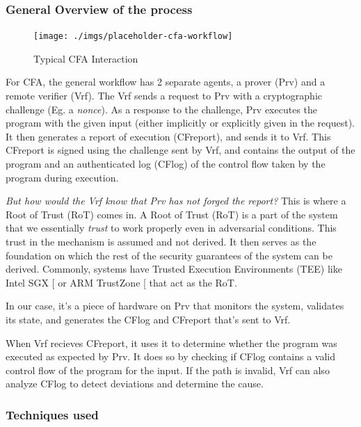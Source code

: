 \documentclass[a4paper, nobind]{templates/ociamthesis}
\begin{document}
\subsubsection{General Overview of the process}\label{general-overview-of-the-process}

\begin{figure}[H]

{\centering \texttt{[image: ./imgs/placeholder-cfa-workflow]} 

}

\caption{Typical CFA Interaction}\label{fig:cfa-workflow}
\end{figure}

For CFA, the general workflow has 2 separate agents, a prover (Prv) and a remote verifier (Vrf).
The Vrf sends a request to Prv with a cryptographic challenge (Eg. a \emph{nonce}).
As a response to the challenge, Prv executes the program with the given
input (either implicitly or explicitly given in the request).
It then generates a report of execution (CFreport), and sends it to Vrf.
This CFreport is signed using the challenge sent by Vrf, and contains the output of the program and an
authenticated log (CFlog) of the control flow taken by the program during execution.

\emph{But how would the Vrf know that Prv has not forged the report?}
This is where a Root of Trust (RoT) comes in.
A Root of Trust (RoT) is a part of the system that we essentially \emph{trust} to work
properly even in adversarial conditions. This trust in the mechanism is assumed and not derived.
It then serves as the foundation on which the rest of the security guarantees
of the system can be derived. Commonly, systems have Trusted Execution Environments
(TEE) like Intel SGX {[}\citeproc{ref-intel-sgx}{33}{]} or ARM TrustZone {[}\citeproc{ref-armtz}{7}{]} that act as the RoT.

In our case, it's a piece of hardware on Prv that monitors the system, validates its state,
and generates the CFlog and CFreport that's sent to Vrf.

When Vrf recieves CFreport, it uses it to determine whether the program was executed as expected by Prv.
It does so by checking if CFlog contains a valid control flow of the program
for the input. If the path is invalid, Vrf can also analyze CFlog to detect
deviations and determine the cause.

\subsubsection{Techniques used}\label{cfatechniques}
\end{document}

